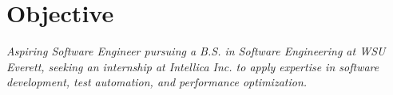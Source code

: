 \section{Objective}
\textit{Aspiring Software Engineer pursuing a B.S. in Software Engineering at WSU Everett, seeking an internship at Intellica Inc. to apply expertise in software development, test automation, and performance optimization. \\}
